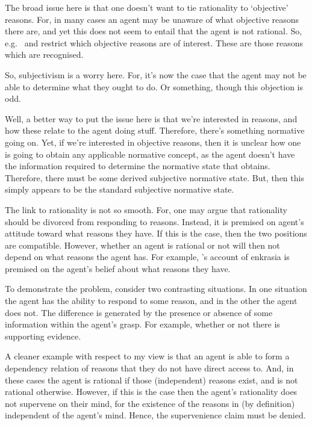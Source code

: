\documentclass[10pt]{article}
\begin{document}
\begin{note}
  The broad issue here is that one doesn't want to tie rationality to `objective' reasons.
  For, in many cases an agent may be unaware of what objective reasons there are, and yet this does not seem to entail that the agent is not rational.
  So, e.g.\ \citeauthor{Lord:2018aa} and \citeauthor{Kiesewetter:2017aa} restrict which objective reasons are of interest.
  These are those reasons which are recognised.

  So, subjectivism is a worry here.
  For, it's now the case that the agent may not be able to determine what they ought to do.
  Or something, though this objection is odd.

  Well, a better way to put the issue here is that we're interested in reasons, and how these relate to the agent doing stuff.
  Therefore, there's something normative going on.
  Yet, if we're interested in objective reasons, then it is unclear how one is going to obtain any applicable normative concept, as the agent doesn't have the information required to determine the normative state that obtains.
  Therefore, there must be some derived subjective normative state.
  But, then this simply appears to be the standard subjective normative state.
\end{note}


\begin{note}
  The link to rationality is not so smooth.
  For, one may argue that rationality should be divorced from responding to reasons.
  Instead, it is premised on agent's attitude toward what reasons they have.
  If this is the case, then the two positions are compatible.
  However, whether an agent is rational or not will then not depend on what reasons the agent has.
  For example, \citeauthor{Broome:2013aa}'s account of enkrasia is premised on the agent's belief about what reasons they have.
\end{note}

To demonstrate the problem, consider two contrasting situations.
In one situation the agent has the ability to respond to some reason, and in the other the agent does not.
The difference is generated by the presence or absence of some information within the agent's grasp.
For example, whether or not there is supporting evidence.

A cleaner example with respect to my view is that an agent is able to form a dependency relation of reasons that they do not have direct access to.
And, in these cases the agent is rational if those (independent) reasons exist, and is not rational otherwise.
However, if this is the case then the agent's rationality does not supervene on their mind, for the existence of the reasons in (by definition) independent of the agent's mind.
Hence, the supervenience claim must be denied.
\end{document}

